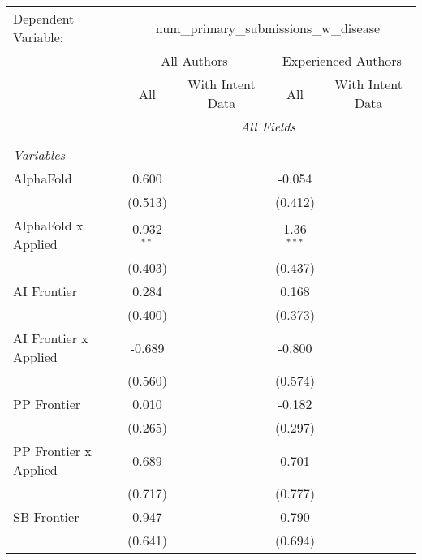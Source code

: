 \begingroup
\centering
\begin{tabular}{lcccccc}
   \tabularnewline \midrule \midrule
   Dependent Variable: & \multicolumn{6}{c}{num\_primary\_submissions\_w\_disease}\\
 & \multicolumn{3}{c}{All Authors} & \multicolumn{3}{c}{Experienced Authors} \\
\cmidrule(lr){2-4} \cmidrule(lr){5-7}
 & \multicolumn{1}{c}{All} & \multicolumn{2}{c}{With Intent Data} & \multicolumn{1}{c}{All} & \multicolumn{2}{c}{With Intent Data} \\
\cmidrule(lr){2-2} \cmidrule(lr){3-4} \cmidrule(lr){5-5} \cmidrule(lr){6-7}
 & \multicolumn{6}{c}{\textit{All Fields}} \\ \\
   \emph{Variables}\\
   AlphaFold             & 0.600        &         &         & -0.054       &        &   \\   
                         & (0.513)      &         &         & (0.412)      &        &   \\   
   AlphaFold x Applied   & 0.932$^{**}$ &         &         & 1.36$^{***}$ &        &   \\   
                         & (0.403)      &         &         & (0.437)      &        &   \\   
   AI Frontier           & 0.284        &         &         & 0.168        &        &   \\   
                         & (0.400)      &         &         & (0.373)      &        &   \\   
   AI Frontier x Applied & -0.689       &         &         & -0.800       &        &   \\   
                         & (0.560)      &         &         & (0.574)      &        &   \\   
   PP Frontier           & 0.010        &         &         & -0.182       &        &   \\   
                         & (0.265)      &         &         & (0.297)      &        &   \\   
   PP Frontier x Applied & 0.689        &         &         & 0.701        &        &   \\   
                         & (0.717)      &         &         & (0.777)      &        &   \\   
   SB Frontier           & 0.947        &         &         & 0.790        &        &   \\   
                         & (0.641)      &         &         & (0.694)      &        &   \\   

\end{tabular}
